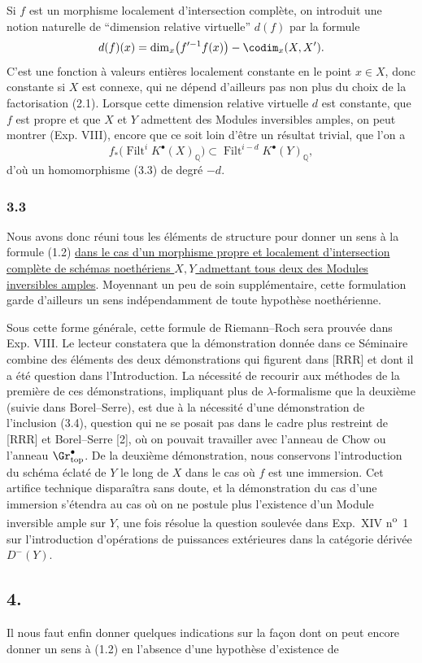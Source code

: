 Si $f$ est un
morphisme localement d'intersection compl\`ete, on introduit une notion naturelle de ``dimension relative virtuelle'' $d(f)$ par la formule
\[
d(f)(x)=\dim_x\bigl(f'^{-1}f(x)\bigr)-\codim_x(X,X').
\]
C'est une fonction \`a valeurs enti\`eres localement constante en le point $x\in X$, donc constante si $X$ est connexe, qui ne d\'epend d'ailleurs pas non plus du choix de la factorisation (2.1). Lorsque cette dimension relative virtuelle $d$ est constante, que $f$ est propre et que $X$ et $Y$ admettent des Modules inversibles amples, on peut montrer (Exp. VIII), encore que ce soit loin d'\^etre un r\'esultat trivial, que l'on a
\begin{equation}\tag{3 4}
f_*\bigl(\operatorname{Filt}^iK^\bullet(X)_{\mathbb Q}\bigr)\subset \operatorname{Filt}^{i-d}K^\bullet(Y)_{\mathbb Q},
\end{equation}
d'o\`u un homomorphisme (3.3) de degr\'e $-d$.

\subsubsection*{3.3}
Nous avons donc r\'euni tous les \'el\'ements de structure pour donner un sens \`a la formule (1.2) \uline{dans le cas d'un morphisme propre et localement d'intersection compl\`ete de sch\'emas noeth\'eriens $X,Y$ admettant tous deux des Modules inversibles amples}. Moyennant un peu de soin suppl\'ementaire, cette formulation garde d'ailleurs un sens ind\'ependamment de toute hypoth\`ese noeth\'erienne.

Sous cette forme g\'en\'erale, cette formule de Riemann--Roch sera prouv\'ee dans Exp. VIII. Le lecteur constatera que la d\'emonstration donn\'ee dans ce S\'eminaire combine des \'el\'ements des deux d\'emonstrations qui figurent dans [RRR] et dont il a \'et\'e question dans l'Introduction. La n\'ecessit\'e de recourir aux m\'ethodes de la premi\`ere de ces d\'emonstrations, impliquant plus de $\lambda$-formalisme que la deuxi\`eme (suivie dans Borel--Serre), est due \`a la n\'ecessit\'e d'une d\'emonstration de l'inclusion (3.4), question qui ne se posait pas dans le cadre plus restreint de [RRR] et Borel--Serre [2], o\`u on pouvait travailler avec l'anneau de Chow ou l'anneau $\Gr^\bullet_{\mathrm{top}}$. De la deuxi\`eme d\'emonstration, nous conservons l'introduction du sch\'ema \'eclat\'e de $Y$ le long de $X$ dans le cas o\`u $f$ est une immersion. Cet artifice technique dispara\^itra sans doute, et la d\'emonstration du cas d'une immersion s'\'etendra au cas o\`u on ne postule plus l'existence d'un Module inversible ample sur $Y$, une fois r\'esolue la question soulev\'ee dans Exp.\ XIV n\textsuperscript{o}~1 sur l'introduction d'op\'erations de puissances ext\'erieures dans la cat\'egorie d\'eriv\'ee $D^-(Y)$.

\subsection*{4.}
Il nous faut enfin donner quelques indications sur la fa\c{c}on dont on peut encore donner un sens \`a (1.2) en l'absence d'une hypoth\`ese d'existence de
